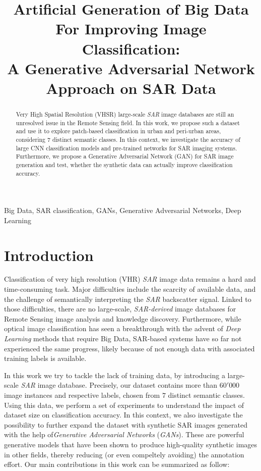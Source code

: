 \documentclass{article}
\title{Artificial Generation of Big Data For Improving Image Classification:\\ A Generative Adversarial Network Approach on SAR Data}
\begin{document}
\maketitle

\begin{abstract}

Very High Spatial Resolution (VHSR) large-scale \emph{SAR} image
databases are still an unresolved issue in the Remote Sensing field.
In this work, we propose such a dataset and use it to explore
patch-based classification in urban and peri-urban areas, considering
$7$ distinct semantic classes.  In this context, we investigate the
accuracy of large CNN classification models and pre-trained networks
for SAR imaging systems.  Furthermore, we propose a Generative
Adversarial Network (GAN) for SAR image generation and test, whether
the synthetic data can actually improve classification accuracy.

\end{abstract}
%

\begin{keywords}
Big Data, SAR classification, GANs, Generative Adversarial Networks, Deep Learning
\end{keywords}
%

\section{Introduction}
\label{sec:intro}

Classification of very high resolution (VHR) \emph{SAR} image data
remains a hard and time-consuming task.
%
Major difficulties include the scarcity of available data, and the
challenge of semantically interpreting the \emph{SAR} backscatter
signal.
%
Linked to those difficulties, there are no large-scale,
\emph{SAR-derived} image databases for Remote Sensing image analysis
and knowledge discovery.
%
Furthermore, while optical image classification has seen a
breakthrough with the advent of \emph{Deep Learning} methods that
require Big Data, SAR-based systems have so far not experienced the
same progress, likely because of not enough data with associated
training labels is available.

In this work we try to tackle the lack of training data, by
introducing a large-scale \emph{SAR} image database.
%
Precisely, our dataset contains more than $60'000$ image instances and
respective labels, chosen from $7$ distinct semantic classes.
%
Using this data, we perform a set of experiments to understand the
impact of dataset size on classification accuracy.
%
In this context, we also investigate the possibility to further expand
the dataset with synthetic SAR images generated with the help
of\emph{Generative Adversarial Networks} (\emph{GANs}).
%
These are powerful generative models that have been shown to produce
high-quality synthetic images in other fields, thereby reducing (or
even compeltely avoiding) the annotation effort.
%
Our main contributions in this work can be summarized as follow:
\end{document}
